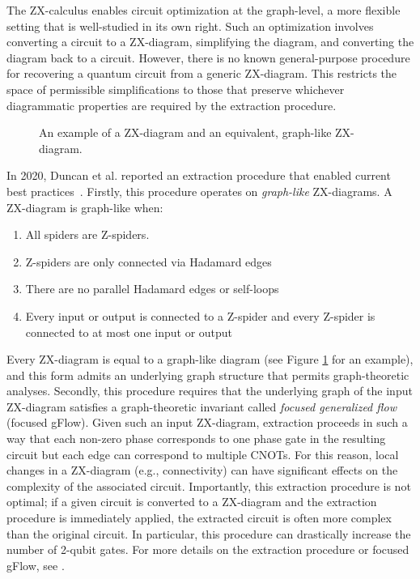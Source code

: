 The ZX-calculus enables circuit optimization at the graph-level, a more flexible setting that is well-studied in its own right.
Such an optimization involves converting a circuit to a ZX-diagram, simplifying the diagram, and converting the diagram back to a circuit. %
However, there is no known general-purpose procedure for recovering a quantum circuit from a generic ZX-diagram.
This restricts the space of permissible simplifications to those that preserve whichever diagrammatic properties are required by the extraction procedure.


\begin{figure}
\centering
{}
\caption{An example of a ZX-diagram and an equivalent, graph-like ZX-diagram.}
\label{fig:graph-like}
\end{figure}

In 2020, Duncan et al. reported an extraction procedure that enabled current best practices~\cite{duncan2020graph}.
Firstly, this procedure operates on \emph{graph-like} ZX-diagrams.
A ZX-diagram is graph-like when:
\begin{enumerate}
\item
  All spiders are Z-spiders.
\item
  Z-spiders are only connected via Hadamard edges
\item
  There are no parallel Hadamard edges or self-loops
\item
  Every input or output is connected to a Z-spider and every Z-spider is connected to at most one input or output
\end{enumerate}
Every ZX-diagram is equal to a graph-like diagram (see Figure \ref{fig:graph-like} for an example), and this form admits an underlying graph structure that permits graph-theoretic analyses.
Secondly, this procedure requires that the underlying graph of the input ZX-diagram satisfies a graph-theoretic invariant called \emph{focused generalized flow} (focused gFlow). %
Given such an input ZX-diagram, extraction proceeds in such a way that each non-zero phase corresponds to one phase gate in the resulting circuit but each edge can correspond to multiple CNOTs.
For this reason, local changes in a ZX-diagram (e.g., connectivity) can have significant effects on the complexity of the associated circuit.
Importantly, this extraction procedure is not optimal;
if a given circuit is converted to a ZX-diagram and the extraction procedure is immediately applied, the extracted circuit is often more complex than the original circuit.
In particular, this procedure can drastically increase the number of 2-qubit gates.
For more details on the extraction procedure or focused gFlow, see \cite{duncan2020graph}.

